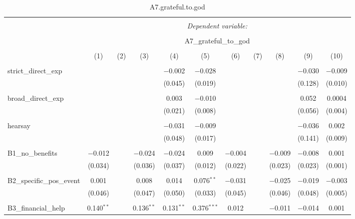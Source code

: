 
\begin{table}[H] \centering 
  \caption{A7.grateful.to.god} 
  \label{} 
\tiny 
\begin{tabular}{@{\extracolsep{4pt}}lcccccccccc} 
\\[-1.8ex]\hline 
\hline \\[-1.8ex] 
 & \multicolumn{10}{c}{\textit{Dependent variable:}} \\ 
\cline{2-11} 
\\[-1.8ex] & \multicolumn{10}{c}{A7\_grateful\_to\_god} \\ 
\\[-1.8ex] & (1) & (2) & (3) & (4) & (5) & (6) & (7) & (8) & (9) & (10)\\ 
\hline \\[-1.8ex] 
 strict\_direct\_exp &  &  &  & $-$0.002 & $-$0.028 &  &  &  & $-$0.030 & $-$0.009 \\ 
  &  &  &  & (0.045) & (0.019) &  &  &  & (0.128) & (0.010) \\ 
  & & & & & & & & & & \\ 
 broad\_direct\_exp &  &  &  & 0.003 & $-$0.010 &  &  &  & 0.052 & 0.0004 \\ 
  &  &  &  & (0.021) & (0.008) &  &  &  & (0.056) & (0.004) \\ 
  & & & & & & & & & & \\ 
 hearsay &  &  &  & $-$0.031 & $-$0.009 &  &  &  & $-$0.036 & 0.002 \\ 
  &  &  &  & (0.048) & (0.017) &  &  &  & (0.141) & (0.009) \\ 
  & & & & & & & & & & \\ 
 B1\_no\_benefits & $-$0.012 &  & $-$0.024 & $-$0.024 & 0.009 & $-$0.004 &  & $-$0.009 & $-$0.008 & 0.001 \\ 
  & (0.034) &  & (0.036) & (0.037) & (0.012) & (0.022) &  & (0.023) & (0.023) & (0.001) \\ 
  & & & & & & & & & & \\ 
 B2\_specific\_pos\_event & 0.001 &  & 0.008 & 0.014 & 0.076$^{**}$ & $-$0.031 &  & $-$0.025 & $-$0.019 & $-$0.003 \\ 
  & (0.046) &  & (0.047) & (0.050) & (0.033) & (0.045) &  & (0.046) & (0.048) & (0.005) \\ 
  & & & & & & & & & & \\ 
 B3\_financial\_help & 0.140$^{**}$ &  & 0.136$^{**}$ & 0.131$^{**}$ & 0.376$^{***}$ & 0.012 &  & $-$0.011 & $-$0.014 & 0.001 \\ 

\end{tabular}
\end{table}
